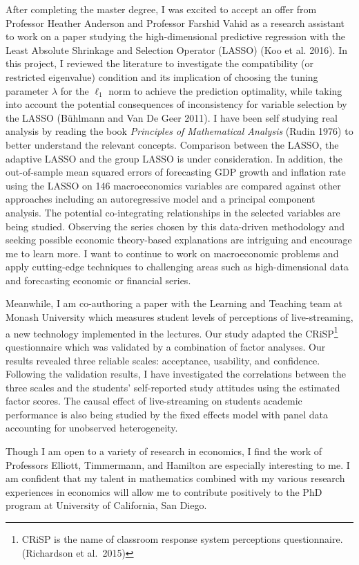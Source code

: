 \documentclass[12pt,]{article}
\let\rmarkdownfootnote\footnote%
\def\footnote{\protect\rmarkdownfootnote}
\begin{document}
After completing the master degree, I was excited to accept an offer
from Professor Heather Anderson and Professor Farshid Vahid as a
research assistant to work on a paper studying the high-dimensional
predictive regression with the Least Absolute Shrinkage and Selection
Operator (LASSO) (Koo et al. 2016). In this project, I reviewed the
literature to investigate the compatibility (or restricted eigenvalue)
condition and its implication of choosing the tuning parameter
\(\lambda\) for the \(\ell_1\) norm to achieve the prediction
optimality, while taking into account the potential consequences of
inconsistency for variable selection by the LASSO (Bühlmann and Van De
Geer 2011). I have been self studying real analysis by reading the book
\emph{Principles of Mathematical Analysis} (Rudin 1976) to better
understand the relevant concepts. Comparison between the LASSO, the
adaptive LASSO and the group LASSO is under consideration. In addition,
the out-of-sample mean squared errors of forecasting GDP growth and
inflation rate using the LASSO on 146 macroeconomics variables are
compared against other approaches including an autoregressive model and
a principal component analysis. The potential co-integrating
relationships in the selected variables are being studied. Observing the
series chosen by this data-driven methodology and seeking possible
economic theory-based explanations are intriguing and encourage me to
learn more. I want to continue to work on macroeconomic problems and
apply cutting-edge techniques to challenging areas such as
high-dimensional data and forecasting economic or financial series.

Meanwhile, I am co-authoring a paper with the Learning and Teaching team
at Monash University which measures student levels of perceptions of
live-streaming, a new technology implemented in the lectures. Our study
adapted the CRiSP\footnote{CRiSP is the name of classroom response
  system perceptions questionnaire. (Richardson et al.~2015)}
questionnaire which was validated by a combination of factor analyses.
Our results revealed three reliable scales: acceptance, usability, and
confidence. Following the validation results, I have investigated the
correlations between the three scales and the students' self-reported
study attitudes using the estimated factor scores. The causal effect of
live-streaming on students academic performance is also being studied by
the fixed effects model with panel data accounting for unobserved
heterogeneity.

Though I am open to a variety of research in economics, I find the work
of Professors Elliott, Timmermann, and Hamilton are especially
interesting to me. I am confident that my talent in mathematics combined
with my various research experiences in economics will allow me to
contribute positively to the PhD program at University of California,
San Diego.
\end{document}
